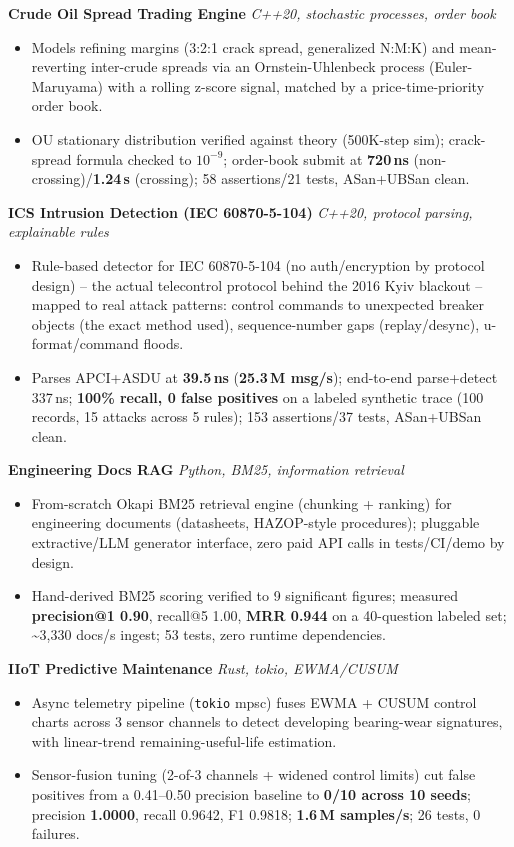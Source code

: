 \documentclass[10pt]{article}
\newcommand{\projectentry}[2]{%
  \noindent\textbf{#1} \hfill \textit{#2}\\[-0.3em]
}
\begin{document}
\projectentry{Crude Oil Spread Trading Engine}{C++20, stochastic processes, order book}
\begin{itemize}
  \item Models refining margins (3:2:1 crack spread, generalized N:M:K) and mean-reverting inter-crude spreads via an Ornstein-Uhlenbeck process (Euler-Maruyama) with a rolling z-score signal, matched by a price-time-priority order book.
  \item OU stationary distribution verified against theory (500K-step sim); crack-spread formula checked to $10^{-9}$; order-book submit at \textbf{720\,ns} (non-crossing)/\textbf{1.24\,\textmu s} (crossing); 58 assertions/21 tests, ASan+UBSan clean.
\end{itemize}

\projectentry{ICS Intrusion Detection (IEC 60870-5-104)}{C++20, protocol parsing, explainable rules}
\begin{itemize}
  \item Rule-based detector for IEC 60870-5-104 (no auth/encryption by protocol design) -- the actual telecontrol protocol behind the 2016 Kyiv blackout -- mapped to real attack patterns: control commands to unexpected breaker objects (the exact method used), sequence-number gaps (replay/desync), u-format/command floods.
  \item Parses APCI+ASDU at \textbf{39.5\,ns} (\textbf{25.3\,M msg/s}); end-to-end parse+detect 337\,ns; \textbf{100\% recall, 0 false positives} on a labeled synthetic trace (100 records, 15 attacks across 5 rules); 153 assertions/37 tests, ASan+UBSan clean.
\end{itemize}

\projectentry{Engineering Docs RAG}{Python, BM25, information retrieval}
\begin{itemize}
  \item From-scratch Okapi BM25 retrieval engine (chunking + ranking) for engineering documents (datasheets, HAZOP-style procedures); pluggable extractive/LLM generator interface, zero paid API calls in tests/CI/demo by design.
  \item Hand-derived BM25 scoring verified to 9 significant figures; measured \textbf{precision@1 0.90}, recall@5 1.00, \textbf{MRR 0.944} on a 40-question labeled set; \textasciitilde3{,}330 docs/s ingest; 53 tests, zero runtime dependencies.
\end{itemize}

\projectentry{IIoT Predictive Maintenance}{Rust, tokio, EWMA/CUSUM}
\begin{itemize}
  \item Async telemetry pipeline (\texttt{tokio} mpsc) fuses EWMA + CUSUM control charts across 3 sensor channels to detect developing bearing-wear signatures, with linear-trend remaining-useful-life estimation.
  \item Sensor-fusion tuning (2-of-3 channels + widened control limits) cut false positives from a 0.41--0.50 precision baseline to \textbf{0/10 across 10 seeds}; precision \textbf{1.0000}, recall 0.9642, F1 0.9818; \textbf{1.6\,M samples/s}; 26 tests, 0 failures.
\end{itemize}
\end{document}
